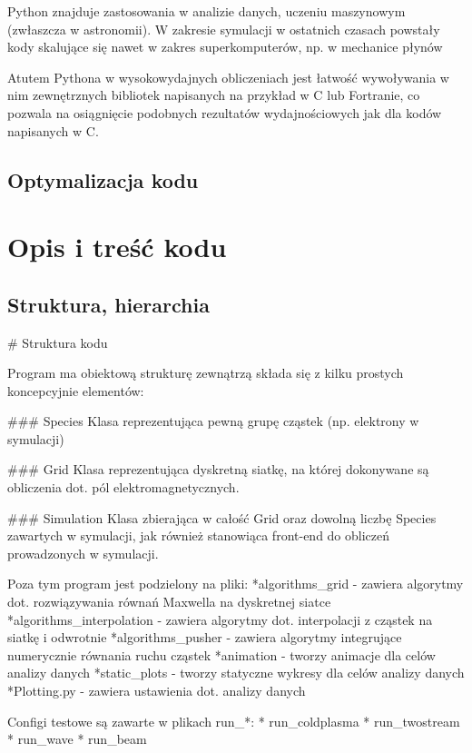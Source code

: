 Python znajduje zastosowania w analizie danych, uczeniu maszynowym (zwłaszcza w astronomii). W zakresie symulacji
w ostatnich czasach powstały kody skalujące się nawet w zakres superkomputerów, np. w mechanice płynów %

Atutem Pythona w wysokowydajnych obliczeniach jest łatwość wywoływania w nim zewnętrznych bibliotek napisanych
na przykład w C lub Fortranie, co pozwala na osiągnięcie podobnych rezultatów wydajnościowych jak dla kodów
napisanych w C.

\subsection{Optymalizacja kodu}
\section{Opis i treść kodu} %
\subsection{Struktura, hierarchia}
# Struktura kodu

Program ma obiektową strukturę zewnątrzą %
składa się z kilku prostych koncepcyjnie elementów:

### Species
Klasa reprezentująca pewną grupę cząstek (np. elektrony w symulacji)

### Grid
Klasa reprezentująca dyskretną siatkę, na której dokonywane są obliczenia dot. pól elektromagnetycznych.

### Simulation
Klasa zbierająca w całość Grid oraz dowolną liczbę Species zawartych w symulacji, jak również
stanowiąca front-end %
do obliczeń prowadzonych w symulacji.

Poza tym program jest podzielony na pliki:
*algorithms_grid - zawiera algorytmy dot. rozwiązywania równań Maxwella na dyskretnej siatce
*algorithms_interpolation - zawiera algorytmy dot. interpolacji z cząstek na siatkę i odwrotnie
*algorithms_pusher - zawiera algorytmy integrujące numerycznie równania ruchu cząstek
*animation - tworzy animacje dla celów analizy danych
*static_plots - tworzy statyczne wykresy dla celów analizy danych
*Plotting.py - zawiera ustawienia dot. analizy danych %

Configi testowe są zawarte w plikach run_*: %
* run_coldplasma
* run_twostream
* run_wave
* run_beam

